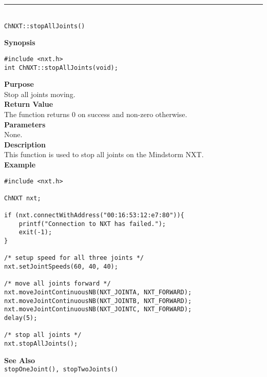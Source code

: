\noindent
\vspace{5pt}
\rule{4.5in}{0.015in}\\
\noindent
{\LARGE \texttt{ChNXT::stopAllJoints()} }\\


\noindent
{\bf Synopsis}
\begin{lstlisting}
#include <nxt.h>
int ChNXT::stopAllJoints(void);
\end{lstlisting}

\noindent
{\bf Purpose}\\
Stop all joints moving.\\

\noindent
{\bf Return Value}\\
The function returns 0 on success and non-zero otherwise.\\

\noindent
{\bf Parameters}\\
None.\\

\noindent
{\bf Description}\\
This function is used to stop all joints on the Mindstorm NXT.\\

\noindent
{\bf Example}
\begin{lstlisting}
#include <nxt.h> 

ChNXT nxt;

if (nxt.connectWithAddress("00:16:53:12:e7:80")){
    printf("Connection to NXT has failed.");
    exit(-1);
}
    
/* setup speed for all three joints */
nxt.setJointSpeeds(60, 40, 40);

/* move all joints forward */
nxt.moveJointContinuousNB(NXT_JOINTA, NXT_FORWARD);
nxt.moveJointContinuousNB(NXT_JOINTB, NXT_FORWARD);
nxt.moveJointContinuousNB(NXT_JOINTC, NXT_FORWARD);
delay(5);

/* stop all joints */
nxt.stopAllJoints();
\end{lstlisting}

\noindent
{\bf See Also}\\
\texttt{stopOneJoint(), stopTwoJoints()}\\
